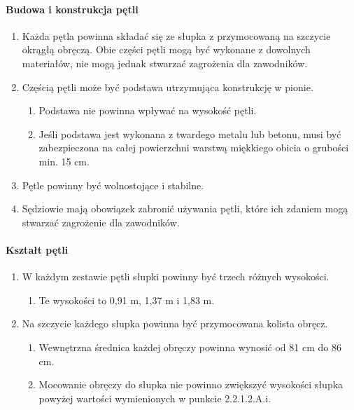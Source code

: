 \documentclass[12pt]{article}
\begin{document}
\paragraph{Budowa i konstrukcja pętli}
\begin{enumerate}
\item Każda pętla powinna składać się ze słupka z przymocowaną na szczycie
okrągłą obręczą. Obie części pętli mogą być wykonane z dowolnych
materiałów, nie mogą jednak stwarzać zagrożenia dla zawodników.

\item Częścią pętli może być podstawa utrzymująca konstrukcję w pionie.
  \begin{enumerate}
  \item Podstawa nie powinna wpływać na wysokość pętli.

  \item Jeśli podstawa jest wykonana z twardego metalu lub betonu, musi być
zabezpieczona na całej powierzchni warstwą miękkiego obicia o grubości
min. 15 cm.
  \end{enumerate}

\item Pętle powinny być wolnostojące i stabilne.

\item Sędziowie mają obowiązek zabronić używania pętli, które ich zdaniem
mogą stwarzać zagrożenie dla zawodników.
\end{enumerate}

\paragraph{Kształt pętli}
\begin{enumerate}
\item W każdym zestawie pętli słupki powinny być trzech różnych wysokości.
  \begin{enumerate}
  \item Te wysokości to 0,91 m, 1,37 m i 1,83 m.
  \end{enumerate}
\item Na szczycie każdego słupka powinna być przymocowana kolista obręcz.
  \begin{enumerate}
  \item Wewnętrzna średnica każdej obręczy powinna wynosić od 81 cm do 86 cm.

  \item Mocowanie obręczy do słupka nie powinno zwiększyć wysokości słupka
powyżej wartości wymienionych w punkcie 2.2.1.2.A.i.
  \end{enumerate}
\end{enumerate}
\end{document}
